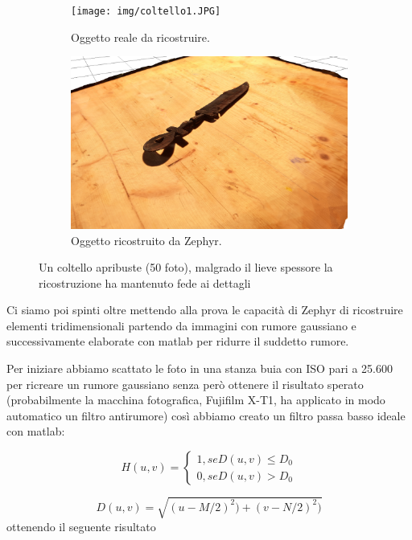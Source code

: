 \documentclass[12pt]{report}
\begin{document}
\begin{figure}[H]
  \centering
  \begin{subfigure}[b]{0.37\linewidth}
    \centering
    \texttt{[image: img/coltello1.JPG]}
    \caption{Oggetto reale da ricostruire.}
  \end{subfigure}
  \begin{subfigure}[b]{0.4\linewidth}
    \centering
    \includegraphics[width=\linewidth]{img/coltello.png}
    \caption{Oggetto ricostruito da Zephyr.}
  \end{subfigure}
  \captionsetup{justification=centering}
  \caption{Un coltello apribuste (50 foto), malgrado il lieve spessore la ricostruzione ha mantenuto fede ai dettagli}
\end{figure}

Ci siamo poi spinti oltre mettendo alla prova le capacit\`a di Zephyr di ricostruire elementi tridimensionali partendo da immagini con rumore gaussiano e successivamente elaborate con matlab per ridurre il suddetto rumore.

Per iniziare abbiamo scattato le foto in una stanza buia con ISO pari a 25.600 per ricreare un rumore gaussiano senza per\`o ottenere il risultato sperato (probabilmente la macchina fotografica, Fujifilm X-T1, ha applicato in modo automatico un filtro antirumore) cos\`i abbiamo creato un filtro passa basso ideale con matlab:

\begin{equation}
H(u,v) = 
\begin{cases}
1,se D(u,v)\leq D_0
\\
0,se D(u,v)>D_0
\end{cases}
\end{equation}

\begin{equation}
D(u,v) = \sqrt{(u-M/2)^{2}) + (v-N/2)^{2})}   
\end{equation}
\newpage
 \noindent ottenendo il seguente risultato
\end{document}
